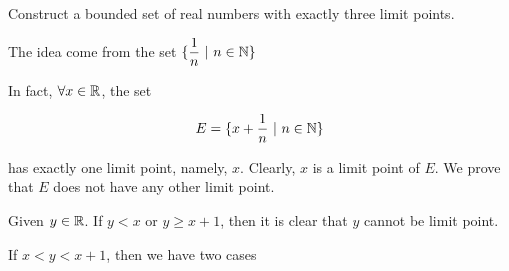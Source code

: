 Construct a bounded set of real numbers with exactly three limit points.

\begin{tcolorbox}
	\begin{solution}
		The idea come from the set $\{\dfrac{1}{n}~|~ n \in \mathbb{N}\}$
		
		In fact, $\forall x \in \mathbb{R}$, the set
		
		$$E = \{x + \dfrac{1}{n} ~|~ n \in \mathbb{N}\}$$
		
		has exactly one limit point, namely, $x$. Clearly, $x$ is a limit point of $E$. We prove that $E$ does not have any other limit point.
		
		Given $y \in \mathbb{R}$. If $y < x$ or $y \geq x + 1$, then  it is clear that $y$ cannot be limit point.
		
		If $x < y < x+1$, then we have two cases
	\end{solution}
\end{tcolorbox}